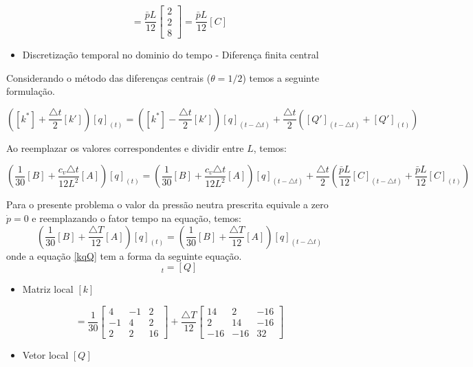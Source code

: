 \documentclass{article} %
\begin{document}
\begin{equation}
[{Q}']=\frac{\bar{p}L}{12}\begin{bmatrix}
2\\2\\8
\end{bmatrix}=\frac{\bar{p}L}{12}[C]
\end{equation}

\begin{itemize}
	\item Discretização temporal no dominio do tempo - Diferença finita central
\end{itemize}

Considerando o método das diferenças centrais (\(\theta=1/2\)) temos a seguinte formulação.


\begin{equation}
\left([k^*]+\frac{\triangle t}{2}[{k}']\right)[q]_{(t)}=\left([k^*]-\frac{\triangle t}{2}[{k}']\right)[q]_{(t-\triangle t)}+\frac{\triangle t}{2}\left([{Q}']_{(t-\triangle t)}+[{Q}']_{(t)}\right)
\end{equation}

Ao reemplazar os valores correspondentes e dividir entre  \(L\), temos:

\begin{equation*}
\left(\frac{1}{30}[B]+\frac{c_v\triangle t}{12L^2}[A]\right)[q]_{(t)}=\left(\frac{1}{30}[B]+\frac{c_v\triangle t}{12L^2}[A]\right)[q]_{(t-\triangle t)}+\frac{\triangle t}{2}\left(\frac{\bar{p}L}{12}[C]_{(t-\triangle t)}+\frac{\bar{p}L}{12}[C]_{(t)}\right)
\end{equation*}

Para o presente problema o valor da pressão neutra prescrita equivale a zero \(\dot{p}=0\) e reemplazando o fator tempo na equação, temos:
\begin{equation}\label{kqQ}
\left(\frac{1}{30}[B]+\frac{\triangle T}{12}[A]\right)[q]_{(t)}=\left(\frac{1}{30}[B]+\frac{\triangle T}{12}[A]\right)[q]_{(t-\triangle t)}
\end{equation}
onde a equação \ref{kqQ} tem a forma da seguinte equação.
\begin{equation}
[k][q]_{t}=[Q]
\end{equation}

\begin{itemize}
	\item Matriz local \([k]\)	
\end{itemize}

\begin{equation}
[k]=\frac{1}{30}\begin{bmatrix}
4&-1&2\\
-1&4&2\\
2&2&16
\end{bmatrix}+\frac{\triangle T}{12}\begin{bmatrix}
14 &2&-16 \\
2&14&-16\\
-16&-16&32
\end{bmatrix}
\end{equation}
\begin{itemize}
	\item Vetor local \([Q]\)	
\end{itemize}
\end{document}
